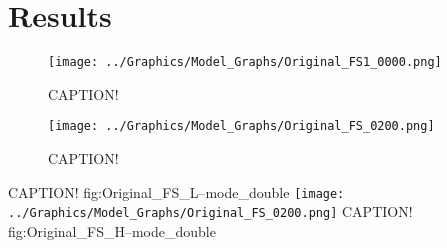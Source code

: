 \chapter{Results}\label{chapter:results}

\begin{figure}[tb]
	\centering
	\texttt{[image: ../Graphics/Model\_Graphs/Original\_FS1\_0000.png]}
	\caption{CAPTION!}
	\label{fig:Original_FS_L--mode}
\end{figure}
\begin{figure}[tb]
	\centering
	\texttt{[image: ../Graphics/Model\_Graphs/Original\_FS\_0200.png]}
	\caption{CAPTION!}
	\label{fig:Original_FS_H--mode}
\end{figure}

	{CAPTION!}
	{fig:Original_FS_L--mode_double}
	{\texttt{[image: ../Graphics/Model\_Graphs/Original\_FS\_0200.png]}}
	{CAPTION!}
	{fig:Original_FS_H--mode_double}

